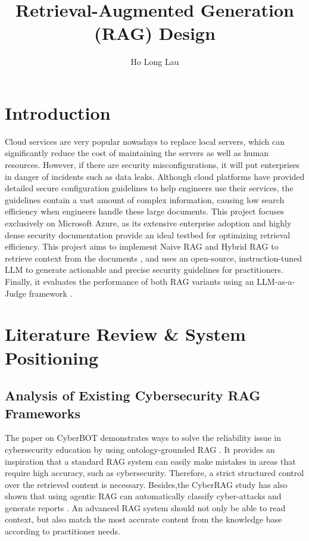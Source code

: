 \documentclass[11pt]{article}
\title{Retrieval-Augmented Generation (RAG) Design}
\author{Ho Long Lau}
\begin{document}
\maketitle

\section{Introduction}

Cloud services are very popular nowadays to replace local servers, which can significantly reduce the cost of maintaining the servers as well as human resources. However, if there are security misconfigurations, it will put enterprises in danger of incidents such as data leaks. Although cloud platforms have provided detailed secure configuration guidelines to help engineers use their services, the guidelines contain a vast amount of complex information, causing low search efficiency when engineers handle these large documents. This project focuses exclusively on Microsoft Azure, as its extensive enterprise adoption and highly dense security documentation provide an ideal testbed for optimizing retrieval efficiency. This project aims to implement Naive RAG and Hybrid RAG to retrieve context from the documents \citep{lewis2020retrieval}, and uses an open-source, instruction-tuned LLM to generate actionable and precise security guidelines for practitioners. Finally, it evaluates the performance of both RAG variants using an LLM-as-a-Judge framework \citep{zheng2023judging}.

\section{Literature Review \& System Positioning}

\subsection{Analysis of Existing Cybersecurity RAG Frameworks}

The paper on CyberBOT demonstrates ways to solve the reliability issue in cybersecurity education by using ontology-grounded RAG \citep{cyberbot2025ontology}. It provides an inspiration that a standard RAG system can easily make mistakes in areas that require high accuracy, such as cybersecurity. Therefore, a strict structured control over the retrieved content is necessary. Besides,the CyberRAG study has also shown that using agentic RAG can automatically classify cyber-attacks and generate reports \citep{blefari2025cyberrag}. An advanced RAG system should not only be able to read context, but also match the most accurate content from the knowledge base according to practitioner needs.
\end{document}
